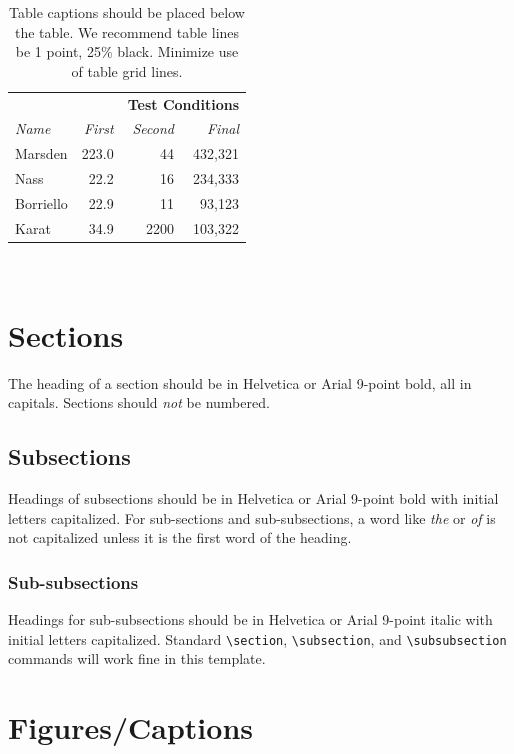 \documentclass{sigchi}
\begin{document}
\begin{table}
  \centering
  \begin{tabular}{l r r r}
    & & \multicolumn{2}{c}{\small{\textbf{Test Conditions}}} \\
    \cmidrule(r){3-4}
    {\small\textit{Name}}
    & {\small \textit{First}}
      & {\small \textit{Second}}
    & {\small \textit{Final}} \\
    \midrule
    Marsden & 223.0 & 44 & 432,321 \\
    Nass & 22.2 & 16 & 234,333 \\
    Borriello & 22.9 & 11 & 93,123 \\
    Karat & 34.9 & 2200 & 103,322 \\
  \end{tabular}
  \caption{Table captions should be placed below the table. We
    recommend table lines be 1 point, 25\% black. Minimize use of
    table grid lines.}~\label{tab:table1}
\end{table}

\section{Sections}

The heading of a section should be in Helvetica or Arial 9-point bold,
all in capitals. Sections should \textit{not} be numbered.

\subsection{Subsections}

Headings of subsections should be in Helvetica or Arial 9-point bold
with initial letters capitalized.  For sub-sections and
sub-subsections, a word like \emph{the} or \emph{of} is not
capitalized unless it is the first word of the heading.

\subsubsection{Sub-subsections}

Headings for sub-subsections should be in Helvetica or Arial 9-point
italic with initial letters capitalized.  Standard
\texttt{{\textbackslash}section}, \texttt{{\textbackslash}subsection},
and \texttt{{\textbackslash}subsubsection} commands will work fine in
this template.

\section{Figures/Captions}
\end{document}
